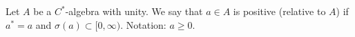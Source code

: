 Let $A$ be a $C^*$-algebra with unity. We say that $a \in A$ is positive (relative to $A$) if $a^* = a$ and $\sigma(a) \subset [0, \infty)$. Notation: $a \geq 0$.
